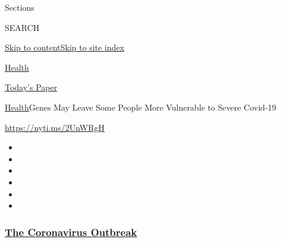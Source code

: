 Sections

SEARCH

\protect\hyperlink{site-content}{Skip to
content}\protect\hyperlink{site-index}{Skip to site index}

\href{https://www.nytimes3xbfgragh.onion/section/health}{Health}

\href{https://myaccount.nytimes3xbfgragh.onion/auth/login?response_type=cookie\&client_id=vi}{}

\href{https://www.nytimes3xbfgragh.onion/section/todayspaper}{Today's
Paper}

\href{/section/health}{Health}\textbar{}Genes May Leave Some People More
Vulnerable to Severe Covid-19

\url{https://nyti.ms/2UnWRgH}

\begin{itemize}
\item
\item
\item
\item
\item
\item
\end{itemize}

\hypertarget{the-coronavirus-outbreak}{%
\subsubsection{\texorpdfstring{\href{https://www.nytimes3xbfgragh.onion/news-event/coronavirus?name=styln-coronavirus-national\&region=TOP_BANNER\&block=storyline_menu_recirc\&action=click\&pgtype=Article\&impression_id=798036b0-efbb-11ea-a5dd-151e10eb2059\&variant=undefined}{The
Coronavirus
Outbreak}}{The Coronavirus Outbreak}}\label{the-coronavirus-outbreak}}

